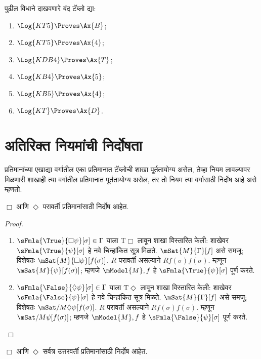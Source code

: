 \begin{prob}
पुढील विधाने दाखवणारे बंद टॅब्लो द्या:
  \begin{enumerate}
  \item $\Log{KT5} \Proves \Ax{B}$;
  \item $\Log{KT5} \Proves \Ax{4}$;
  \item $\Log{KDB4} \Proves \Ax{T}$;
  \item $\Log{KB4} \Proves \Ax{5}$;
  \item $\Log{KB5} \Proves \Ax{4}$;
  \item $\Log{KT} \Proves \Ax{D}$.
  \end{enumerate}
\end{prob}
\section{अतिरिक्त नियमांची निर्दोषता}\label{nml:tab:msn:sec}
प्रतिमानांच्या एखाद्या वर्गातील एका प्रतिमानात
टॅब्लोची शाखा पूर्ततायोग्य असेल, तेव्हा
नियम लावल्यावर मिळणारी शाखाही त्या वर्गातील
प्रतिमानात पूर्ततायोग्य असेल, तर तो नियम त्या
वर्गासाठी निर्दोष आहे असे म्हणतो.
\begin{prop}
  \label{nml:tab:msn:prop:soundness-T}
  $\Box$
   आणि
  $\Diamond$
  परावर्ती प्रतिमानांसाठी
  निर्दोष आहेत.
\end{prop}
\begin{proof}
\begin{enumerate}
\item $\sFmla{\True}{\Box \psi}[\sigma] \in \Gamma$
  याला T$\Box$ लावून शाखा विस्तारित केली:
  शाखेवर
    $\sFmla{\True}{\psi}[\sigma]$ हे नवे चिन्हांकित सूत्र मिळते. $\mSat{M}{\Gamma}[f]$
    असे समजू; विशेषतः $\mSat{M}{\Box
      \psi}[f(\sigma)]$. $R$ परावर्ती असल्याने
    $Rf(\sigma)f(\sigma)$. म्हणून
    $\mSat{M}{\psi}[f(\sigma)]$; म्हणजे
    $\mModel{M}, f$ हे
    $\sFmla{\True}{\psi}[\sigma]$ पूर्ण करते.
\item $\sFmla{\False}{\Diamond \psi}[\sigma] \in \Gamma$
  याला T$\Diamond$ लावून शाखा विस्तारित केली:
  शाखेवर
    $\sFmla{\False}{\psi}[\sigma]$ हे नवे चिन्हांकित सूत्र मिळते. $\mSat{M}{\Gamma}[f]$
    असे समजू; विशेषतः $\mSat/{M}{\Diamond
      \psi}[f(\sigma)]$. $R$ परावर्ती असल्याने
    $Rf(\sigma)f(\sigma)$. म्हणून
    $\mSat/{M}{\psi}[f(\sigma)]$; म्हणजे
    $\mModel{M}, f$ हे
    $\sFmla{\False}{\psi}[\sigma]$ पूर्ण करते.
\end{enumerate}
\end{proof}
\begin{prop}
  \label{nml:tab:msn:prop:soundness-D}
  $\Box$
   आणि
  $\Diamond$
  सर्वत्र उत्तरवर्ती प्रतिमानांसाठी
  निर्दोष आहेत.
\end{prop}
